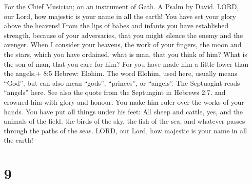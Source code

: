 For the Chief Musician; on an instrument of Gath. A Psalm by David.
 LORD, our Lord, how majestic is your name in all the earth!
You have set your glory above the heavens!  From the lips of
babes and infants you have established strength, because of your
adversaries, that you might silence the enemy and the avenger.
 When I consider your heavens, the work of your fingers, the
moon and the stars, which you have ordained,  what is man,
that you think of him? What is the son of man, that you care for him?
 For you have made him a little lower than the angels,+ 8:5
Hebrew: Elohim. The word Elohim, used here, usually means ``God'', but
can also mean ``gods'', ``princes'', or ``angels''. The Septuagint reads
``angels'' here. See also the quote from the Septuagint in Hebrews 2:7.
and crowned him with glory and honour.  You make him ruler
over the works of your hands. You have put all things under his feet:
 All sheep and cattle, yes, and the animals of the field,
 the birds of the sky, the fish of the sea, and whatever
passes through the paths of the seas.  LORD, our Lord, how
majestic is your name in all the earth!

\hypertarget{section-8}{%
\section{9}\label{section-8}}


